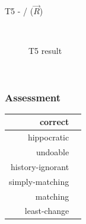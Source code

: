 \documentclass{article}
\newcommand{\cmark}{\ding{51}}%
\begin{document}
\pagebreak
T5 -  /  ($\overrightarrow{R}$)
\begin{figure}[ht]
    \centering
    \mbox{\quad\qquad\quad
          }
    \caption{T5 result}
    \label{fig:T5}
\end{figure}

~\\

\subsubsection{Assessment}



\begin{center}
\begin{tabular}{| r | c | }
  \hline                        
  correct & \cmark \\
  \hline
  hippocratic & \cmark \\
  \hline 
  undoable & \cmark \\
  \hline 
  history-ignorant & \cmark \\
  \hline 
  simply-matching & \cmark \\
  \hline 
  matching & \cmark \\
  \hline 
  least-change & \cmark \\
  \hline   
\end{tabular}
\end{center}
\end{document}
